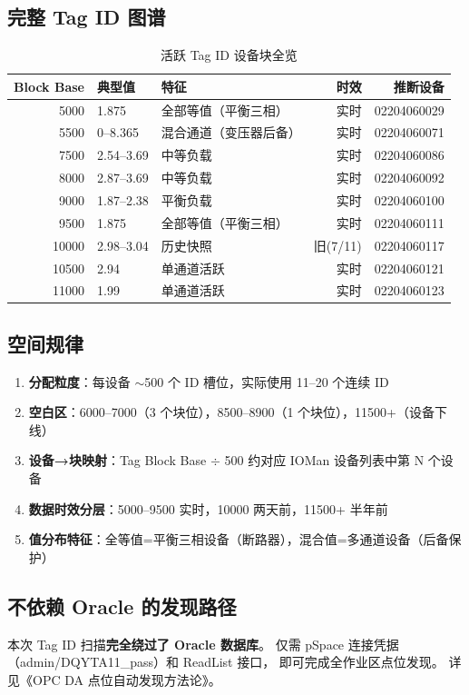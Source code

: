 \documentclass[12pt,a4paper]{ctexart}
\begin{document}
\subsection{完整 Tag ID 图谱}
\begin{table}[H]\centering
\caption{活跃 Tag ID 设备块全览}
\begin{tabular}{rllrr}
\toprule
\textbf{Block Base} & \textbf{典型值} & \textbf{特征} & \textbf{时效} & \textbf{推断设备} \\
\midrule
5000 & 1.875 & 全部等值（平衡三相） & 实时 & 02204060029 \\
5500 & 0--8.365 & 混合通道（变压器后备） & 实时 & 02204060071 \\
7500 & 2.54--3.69 & 中等负载 & 实时 & 02204060086 \\
8000 & 2.87--3.69 & 中等负载 & 实时 & 02204060092 \\
9000 & 1.87--2.38 & 平衡负载 & 实时 & 02204060100 \\
9500 & 1.875 & 全部等值（平衡三相） & 实时 & 02204060111 \\
10000 & 2.98--3.04 & 历史快照 & 旧(7/11) & 02204060117 \\
10500 & 2.94 & 单通道活跃 & 实时 & 02204060121 \\
11000 & 1.99 & 单通道活跃 & 实时 & 02204060123 \\
\bottomrule
\end{tabular}
\end{table}

\subsection{空间规律}
\begin{enumerate}[leftmargin=*]
  \item \textbf{分配粒度}：每设备 $\sim$500 个 ID 槽位，实际使用 11--20 个连续 ID
  \item \textbf{空白区}：6000--7000（3 个块位），8500--8900（1 个块位），11500+（设备下线）
  \item \textbf{设备→块映射}：Tag Block Base $\div$ 500 约对应 IOMan 设备列表中第 N 个设备
  \item \textbf{数据时效分层}：5000--9500 实时，10000 两天前，11500+ 半年前
  \item \textbf{值分布特征}：全等值=平衡三相设备（断路器），混合值=多通道设备（后备保护）
\end{enumerate}

\subsection{不依赖 Oracle 的发现路径}
本次 Tag ID 扫描\textbf{完全绕过了 Oracle 数据库}。
仅需 pSpace 连接凭据（admin/DQYTA11\_pass）和 ReadList 接口，
即可完成全作业区点位发现。
详见《OPC DA 点位自动发现方法论》。
\end{document}
